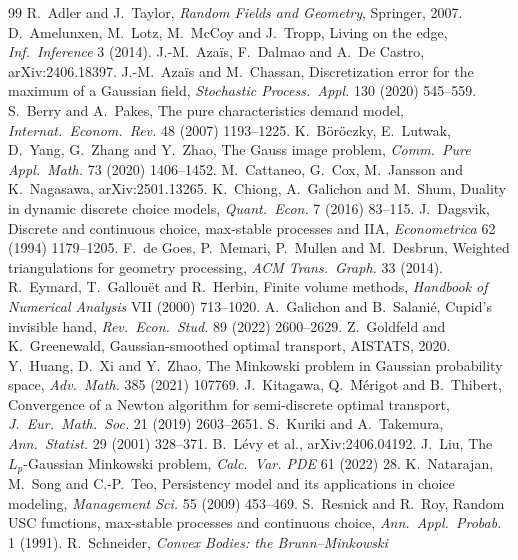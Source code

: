 \documentclass[11pt]{article}
\theoremstyle{definition}
\begin{document}
\begin{thebibliography}{99}
 R.~Adler and J.~Taylor, \emph{Random Fields and
Geometry}, Springer, 2007.
 D.~Amelunxen, M.~Lotz, M.~McCoy and J.~Tropp, Living on
the edge, \emph{Inf.\ Inference} 3 (2014).
 J.-M.~Aza\"is, F.~Dalmao and A.~De Castro, arXiv:2406.18397.
 J.-M.~Aza\"is and M.~Chassan, Discretization error for
the maximum of a Gaussian field, \emph{Stochastic Process.\ Appl.} 130 (2020)
545--559.
 S.~Berry and A.~Pakes, The pure characteristics demand
model, \emph{Internat.\ Econom.\ Rev.} 48 (2007) 1193--1225.
 K.~B\"or\"oczky, E.~Lutwak, D.~Yang, G.~Zhang and Y.~Zhao, The
Gauss image problem, \emph{Comm.\ Pure Appl.\ Math.} 73 (2020) 1406--1452.
 M.~Cattaneo, G.~Cox, M.~Jansson and K.~Nagasawa,
arXiv:2501.13265.
 K.~Chiong, A.~Galichon and M.~Shum, Duality in dynamic discrete
choice models, \emph{Quant.\ Econ.} 7 (2016) 83--115.
 J.~Dagsvik, Discrete and continuous choice, max-stable
processes and IIA, \emph{Econometrica} 62 (1994) 1179--1205.
 F.~de Goes, P.~Memari, P.~Mullen and M.~Desbrun, Weighted
triangulations for geometry processing, \emph{ACM Trans.\ Graph.} 33 (2014).
 R.~Eymard, T.~Gallou\"et and R.~Herbin, Finite volume methods,
\emph{Handbook of Numerical Analysis} VII (2000) 713--1020.
 A.~Galichon and B.~Salani\'e, Cupid's invisible hand,
\emph{Rev.\ Econ.\ Stud.} 89 (2022) 2600--2629.
 Z.~Goldfeld and K.~Greenewald, Gaussian-smoothed optimal
transport, AISTATS, 2020.
 Y.~Huang, D.~Xi and Y.~Zhao, The Minkowski problem in Gaussian
probability space, \emph{Adv.\ Math.} 385 (2021) 107769.
 J.~Kitagawa, Q.~M\'erigot and B.~Thibert, Convergence of a Newton
algorithm for semi-discrete optimal transport, \emph{J.\ Eur.\ Math.\ Soc.} 21
(2019) 2603--2651.
 S.~Kuriki and A.~Takemura, \emph{Ann.\ Statist.} 29
(2001) 328--371.
 B.~L\'evy et al., arXiv:2406.04192.
 J.~Liu, The $L_p$-Gaussian Minkowski problem, \emph{Calc.\ Var.
PDE} 61 (2022) 28.
 K.~Natarajan, M.~Song and C.-P.~Teo, Persistency model and its
applications in choice modeling, \emph{Management Sci.} 55 (2009) 453--469.
 S.~Resnick and R.~Roy, Random USC functions, max-stable
processes and continuous choice, \emph{Ann.\ Appl.\ Probab.} 1 (1991).
 R.~Schneider, \emph{Convex Bodies: the Brunn--Minkowski
}
\end{thebibliography}
\end{document}
